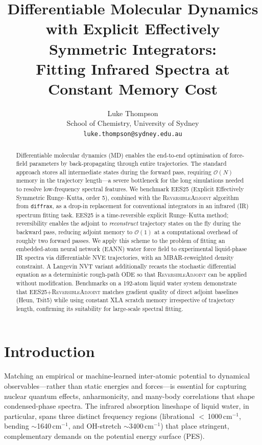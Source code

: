 \documentclass{article}
\title{%
  Differentiable Molecular Dynamics with Explicit Effectively Symmetric Integrators:\\
  Fitting Infrared Spectra at Constant Memory Cost%
}
\author{%
  Luke Thompson\\
  School of Chemistry, University of Sydney\\
  \texttt{luke.thompson@sydney.edu.au}
}
\newcommand{\EES}{\textsc{EES25}}
\newcommand{\RevAdj}{\textsc{ReversibleAdjoint}}
\newcommand{\diffrax}{\texttt{diffrax}}
\newcommand{\EANN}{\textsc{EANN}}
\newcommand{\MBAR}{\textsc{MBAR}}
\begin{document}
\maketitle

\begin{abstract}
Differentiable molecular dynamics (MD) enables the end-to-end optimisation of
force-field parameters by back-propagating through entire trajectories.  The
standard approach stores all intermediate states during the forward pass,
requiring $\mathcal{O}(N)$ memory in the trajectory length---a severe bottleneck
for the long simulations needed to resolve low-frequency spectral features.
We benchmark \EES{} (Explicit Effectively Symmetric Runge--Kutta, order 5),
combined with the \RevAdj{} algorithm from \diffrax, as a drop-in replacement
for conventional integrators in an infrared (IR) spectrum fitting task.
\EES{} is a time-reversible explicit Runge--Kutta method; reversibility
enables the adjoint to \emph{reconstruct} trajectory states on the fly during
the backward pass, reducing adjoint memory to $\mathcal{O}(1)$ at a
computational overhead of roughly two forward passes.
We apply this scheme to the problem of fitting an embedded-atom neural network
(\EANN) water force field to experimental liquid-phase IR spectra via
differentiable NVE trajectories, with an \MBAR{}-reweighted density
constraint.  A Langevin NVT variant additionally recasts the stochastic
differential equation as a deterministic rough-path ODE so that
\RevAdj{} can be applied without modification.
Benchmarks on a 192-atom liquid water system demonstrate that
\EES{}+\RevAdj{} matches gradient quality of direct adjoint baselines
(Heun, Tsit5) while using constant XLA scratch memory irrespective of
trajectory length, confirming its suitability for large-scale spectral
fitting.
\end{abstract}

\section{Introduction}
\label{sec:intro}

Matching an empirical or machine-learned inter-atomic potential to dynamical
observables---rather than static energies and forces---is essential for
capturing nuclear quantum effects, anharmonicity, and many-body correlations
that shape condensed-phase spectra.  The infrared absorption lineshape of
liquid water, in particular, spans three distinct frequency regions (librational
$<$\,1000\,cm$^{-1}$, bending $\sim$1640\,cm$^{-1}$, and OH-stretch
$\sim$3400\,cm$^{-1}$) that place stringent, complementary demands on the
potential energy surface (PES).
\end{document}
